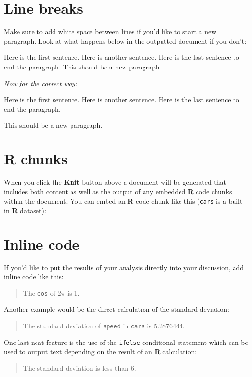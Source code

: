 \documentclass[12pt,twoside]{book}
\begin{document}
\section{Line breaks}\label{line-breaks}

Make sure to add white space between lines if you'd like to start a new paragraph. Look at what happens below in the outputted document if you don't:

Here is the first sentence. Here is another sentence. Here is the last sentence to end the paragraph.
This should be a new paragraph.

\emph{Now for the correct way:}

Here is the first sentence. Here is another sentence. Here is the last sentence to end the paragraph.

This should be a new paragraph.

\section{R chunks}\label{r-chunks}

When you click the \textbf{Knit} button above a document will be generated that includes both content as well as the output of any embedded \textbf{R} code chunks within the document. You can embed an \textbf{R} code chunk like this (\texttt{cars} is a built-in \textbf{R} dataset):

\section{Inline code}\label{inline-code}

If you'd like to put the results of your analysis directly into your discussion, add inline code like this:

\begin{quote}
The \texttt{cos} of \(2 \pi\) is 1.
\end{quote}

Another example would be the direct calculation of the standard deviation:

\begin{quote}
The standard deviation of \texttt{speed} in \texttt{cars} is 5.2876444.
\end{quote}

One last neat feature is the use of the \texttt{ifelse} conditional statement which can be used to output text depending on the result of an \textbf{R} calculation:

\begin{quote}
The standard deviation is less than 6.
\end{quote}
\end{document}
